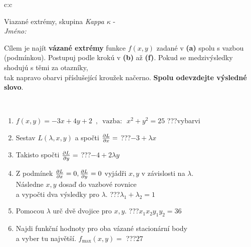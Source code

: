 \documentclass[10pt]{report}
\begin{document}
\begin{tabular}{c:c}
\begin{minipage}[c][104.5mm][t]{0.5\linewidth}
\begin{center}
\vspace{7mm}
{\huge Viazané extrémy, skupina \textit{Kappa $\kappa$} -}\\[5mm]
\textit{Jméno:}\phantom{xxxxxxxxxxxxxxxxxxxxxxxxxxxxxxxxxxxxxxxxxxxxxxxxxxxxxxxxxxxxxxxxx}\\[5mm]
\begin{minipage}{0.95\linewidth}
\begin{center}
Cílem je najít \textbf{vázané extrémy} funkce $f(x,y)$ zadané v \textbf{(a)} spolu s vazbou (podmínkou). Postupuj podle krokú v \textbf{(b)} až \textbf{(f)}. Pokud se medzivýsledky shodujú s těmi za otazníky,\\tak napravo obarvi příslušející kroužek načerno. \textbf{Spolu odevzdejte výsledné slovo}.
\end{center}
\end{minipage}
\\[1mm]
\begin{minipage}{0.79\linewidth}
\begin{center}
\begin{varwidth}{\linewidth}
\begin{enumerate}
\normalsize
\item $f(x,y)=-3x+4y+2 \enspace , \enspace \mathrm{vazba:} \enspace x^2+y^2=25$\quad \dotfill\; ???\;\dotfill \quad vybarvi
\item Sestav $L(\lambda,x,y)$ a spočti $\pdv{L}{x}=$\quad \dotfill\; ???\;\dotfill \quad $-3+\lambda x$
\item Takisto spočti $\pdv{L}{y}=$\quad \dotfill\; ???\;\dotfill \quad $-4+2\lambda y$
\item Z podmínek $\pdv{L}{x}=0 , \pdv{L}{y}=0$ vyjádři $x,y$ v závislosti na $\lambda$.\\ \phantom{xxxxxx}Následne $x,y$ dosaď do vazbové rovnice\\ \phantom{xxxxxx}a vypočti dva výsledky pro $\lambda$.\quad \dotfill\; ???\;\dotfill \quad $\lambda_1+\lambda_2=1$
\item Pomocou $\lambda$ urč dvě dvojice pro $x,y$.\quad \dotfill\; ???\;\dotfill \quad $x_1 x_2 y_1 y_2=36$
\item Najdi funkční hodnoty pro oba vázané stacionární body\\ \phantom{xxxxxx}a vyber tu najvětší. $f_{\text{max}}(x,y)=$\quad \dotfill\; ???\;\dotfill \quad $27$

\end{enumerate}
\end{varwidth}
\end{center}
\end{minipage}
\end{center}
\end{minipage}
\end{tabular}
\end{document}
